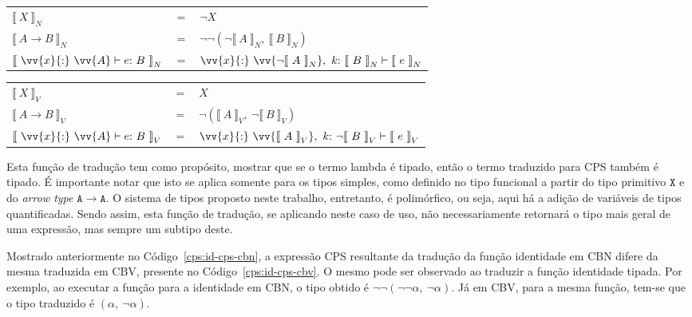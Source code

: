 \phantom{Newline}

\begin{tabular}{lcl}
     ${\llbracket\ X\ \rrbracket}_N$ & $=$ & $\neg X$ \\ 
     ${\llbracket\ A \rightarrow B\ \rrbracket}_N$ & $=$ & $\neg\neg(\neg{\llbracket\ A\ \rrbracket}_N,\ {\llbracket\ B\ \rrbracket}_N)$ \\ 
     ${\llbracket\ \vv{x}{:}\ \vv{A} \vdash e{:}\ B\ \rrbracket}_N$ & $=$ & $\vv{x}{:}\ \vv{\neg{\llbracket\ A\ \rrbracket}_N},\ k{:}\ {\llbracket\ B\ \rrbracket}_N \vdash {\llbracket\ e\ \rrbracket}_N$ \\ 
\end{tabular}

\phantom{Newline}

\begin{tabular}{lcl}
     ${\llbracket\ X\ \rrbracket}_V$ & $=$ & $X$ \\ 
     ${\llbracket\ A \rightarrow B\ \rrbracket}_V$ & $=$ & $\neg({\llbracket\ A\ \rrbracket}_V,\ \neg{\llbracket\ B\ \rrbracket}_V)$ \\ 
     ${\llbracket\ \vv{x}{:}\ \vv{A} \vdash e{:}\ B\ \rrbracket}_V$ & $=$ & $\vv{x}{:}\ \vv{{\llbracket\ A\ \rrbracket}_V},\ k{:}\ \neg{\llbracket\ B\ \rrbracket}_V \vdash {\llbracket\ e\ \rrbracket}_V$ \\ 
\end{tabular}

\phantom{Newline}

\noindent Esta função de tradução tem como propósito, mostrar que se o termo lambda é tipado, então o termo traduzido para CPS também é tipado.
É importante notar que isto se aplica somente para os tipos simples, como definido no tipo funcional a partir do tipo primitivo $\mathtt{X}$ e do \textit{arrow type} $\mathtt{A \to A}$.
O sistema de tipos proposto neste trabalho, entretanto, é polimórfico, ou seja, aqui há a adição de variáveis de tipos quantificadas.
Sendo assim, esta função de tradução, se aplicando neste caso de uso, não necessariamente retornará o tipo mais geral de uma expressão, mas sempre um subtipo deste.

Mostrado anteriormente no Código~\ref{cps:id-cps-cbn}, a expressão CPS resultante da tradução da função identidade em CBN difere da mesma traduzida em CBV, presente no Código~\ref{cps:id-cps-cbv}.
O mesmo pode ser observado ao traduzir a função identidade tipada.
Por exemplo, ao executar a função para a identidade em CBN, o tipo obtido é $\neg\neg(\neg\neg\alpha,\ \neg\alpha)$.
Já em CBV, para a mesma função, tem-se que o tipo traduzido é $(\alpha,\ \neg\alpha)$.

